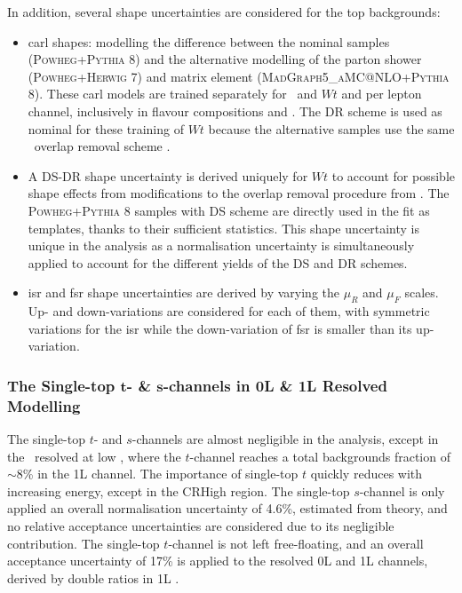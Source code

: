 In addition, several shape uncertainties are considered for the top backgrounds: 
\begin{itemize}[leftmargin=*]
    \item \gls{carl} shapes: modelling the difference between the nominal samples (\textsc{Powheg}+\textsc{Pythia} 8) and the alternative modelling of the parton shower (\textsc{Powheg}+\textsc{Herwig} 7) and matrix element (\textsc{MadGraph5\_aMC@NLO}+\textsc{Pythia} 8). These \gls{carl} models are trained separately for \ttb\ and $Wt$ and per lepton channel, inclusively in flavour compositions and \nj. The DR scheme is used as nominal for these training of $Wt$ because the alternative samples use the same \ttb\ overlap removal scheme \cite{StefanoFrixione_2008}. 
    \item A DS-DR shape uncertainty is derived uniquely for $Wt$ to account for possible shape effects from modifications to the overlap removal procedure from \ttb. The \textsc{Powheg}+\textsc{Pythia} 8 samples with DS scheme are directly used in the fit as templates, thanks to their sufficient statistics. This shape uncertainty is unique in the analysis as a normalisation uncertainty is simultaneously applied to account for the different yields of the DS and DR schemes.
    \item \gls{isr} and \gls{fsr} shape uncertainties are derived by varying the $\mu_R$ and $\mu_F$ scales. Up- and down-variations are considered for each of them, with symmetric variations for the \gls{isr} while the down-variation of \gls{fsr} is smaller than its up-variation.
\end{itemize} 

\subsubsection{The Single-top $\boldsymbol{t}$- \& $\boldsymbol{s}$-channels in 0L \& 1L Resolved Modelling}
The single-top $t$- and $s$-channels are almost negligible in the analysis, except in the \vhb\ resolved at low \ptv, where the $t$-channel reaches a total backgrounds fraction of $\sim$8\% in the 1L channel. The importance of single-top $t$ quickly reduces with increasing energy, except in the CRHigh region. The single-top $s$-channel is only applied an overall normalisation uncertainty of 4.6\%, estimated from theory, and no relative acceptance uncertainties are considered due to its negligible contribution. The single-top $t$-channel is not left free-floating, and an overall acceptance uncertainty of 17\% is applied to the resolved 0L and 1L channels, derived by double ratios in 1L \vhb. \\

